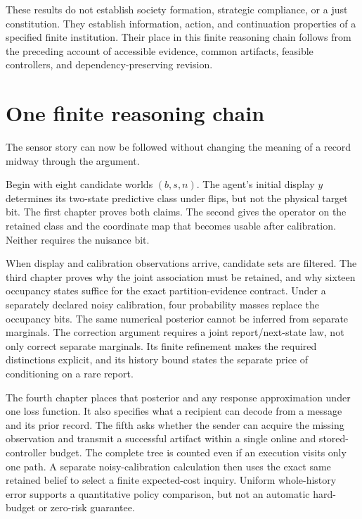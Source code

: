 These results do not establish society formation, strategic compliance, or a just constitution. They establish information, action, and continuation properties of a specified finite institution. Their place in this finite reasoning chain follows from the preceding account of accessible evidence, common artifacts, feasible controllers, and dependency-preserving revision.


\chapter{One finite reasoning chain}\label{Core:book:chapter-9}
\setcounter{section}{0}\label{Core:ch:close}
The sensor story can now be followed without changing the meaning of a record midway through the argument.

Begin with eight candidate worlds $(b,s,n)$. The agent's initial display $y$ determines its two-state predictive class under flips, but not the physical target bit. The first chapter proves both claims. The second gives the operator on the retained class and the coordinate map that becomes usable after calibration. Neither requires the nuisance bit.

When display and calibration observations arrive, candidate sets are filtered. The third chapter proves why the joint association must be retained, and why sixteen occupancy states suffice for the exact partition-evidence contract. Under a separately declared noisy calibration, four probability masses replace the occupancy bits. The same numerical posterior cannot be inferred from separate marginals. The correction argument requires a joint report/next-state law, not only correct separate marginals. Its finite refinement makes the required distinctions explicit, and its history bound states the separate price of conditioning on a rare report.

The fourth chapter places that posterior and any response approximation under one loss function. It also specifies what a recipient can decode from a message and its prior record. The fifth asks whether the sender can acquire the missing observation and transmit a successful artifact within a single online and stored-controller budget. The complete tree is counted even if an execution visits only one path. A separate noisy-calibration calculation then uses the exact same retained belief to select a finite expected-cost inquiry. Uniform whole-history error supports a quantitative policy comparison, but not an automatic hard-budget or zero-risk guarantee.

